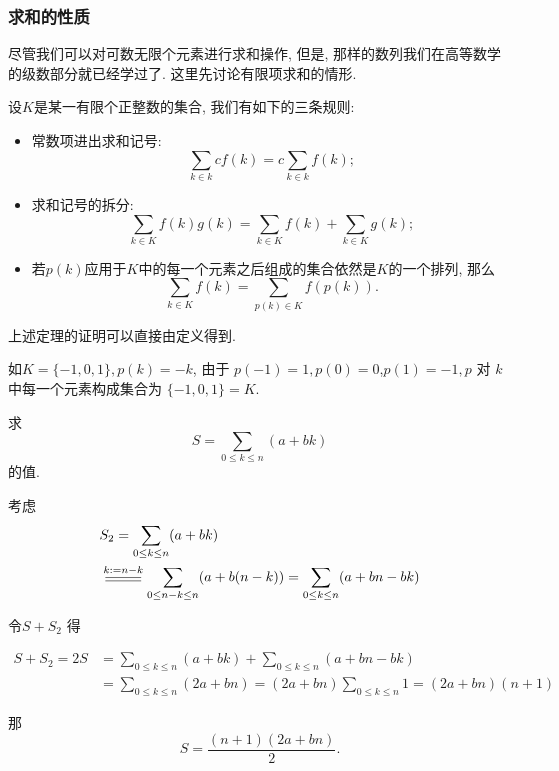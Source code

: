 \documentclass{ctexart}
\begin{document}
\subsubsection{求和的性质}

尽管我们可以对可数无限个元素进行求和操作, 但是, 那样的数列我们在高等数学的级数部分就已经学过了. 这里先讨论有限项求和的情形.

\begin{theorem}
	设$K$是某一有限个正整数的集合, 我们有如下的三条规则:

	\begin{itemize}
		\item 常数项进出求和记号: $$
			      \sum_{k \in k} c f(k)=c \sum_{k \in k} f(k);
		      $$
		\item 求和记号的拆分: $$
			      \sum_{k \in K} f(k) g(k)=\sum_{k \in K} f(k)+\sum_{k \in K} g(k);
		      $$
		\item 若$p(k)$应用于$K$中的每一个元素之后组成的集合依然是$K$的一个排列, 那么$$
			      \sum_{k \in K} f(k)=\sum_{p(k) \in K} f(p(k)).
		      $$
	\end{itemize}
\end{theorem}

上述定理的证明可以直接由定义得到.

\begin{example}
	如$K=\{-1,0,1\}, p(k)=-k$, 由于 $p(-1)=1, p(0)=0$,$p(1)=-1 , p$ 对 $k$ 中每一个元素构成集合为 $\{-1,0,1\}=K$.
\end{example}

\begin{example}[等差数列求和]
	求 $$
		S=\sum_{0 \leq k \leq n}(a+b k)
	$$的值.

	考虑
	$$
		\begin{aligned}
			 & S_2=\sum_{0 \leq k \leq n}(a+b k)                                                           \\
			 & \varsub{k:=n-k}{0.9cm} \sum_{0 \leq n-k \leq n}(a+b(n-k))=\sum_{0 \leq k \leq n}(a+b n-b k)
		\end{aligned}
	$$

	令$S+S_2$ 得

	$$
		\begin{aligned}
			S+S_2=2 S & =\sum_{0 \leq k \leq n}(a+b k)+\sum_{0 \leq k \leq n}(a+b n-b k)                   \\
			          & =\sum_{0 \leq k \leq n}(2 a+b n)=(2 a+b n) \sum_{0 \leq k \leq n} 1=(2 a+b n)(n+1)
		\end{aligned}
	$$

	那 $$
		S=\frac{(n+1)(2 a+b n)}{2}.
	$$

\end{example}
\end{document}
